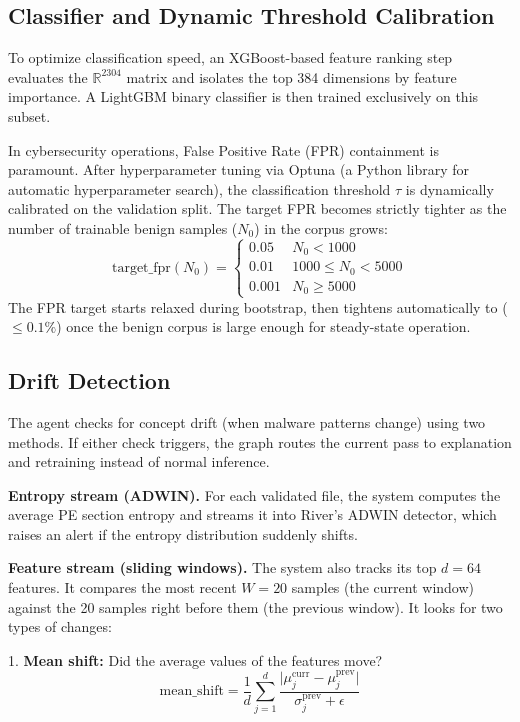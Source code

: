 \documentclass[letterpaper,10pt,conference]{ieeeconf}
\begin{document}
\subsection{Classifier and Dynamic Threshold Calibration}
To optimize classification speed, an XGBoost-based feature ranking step evaluates the $\mathbb{R}^{2304}$ matrix and isolates the top 384 dimensions by feature importance. A LightGBM binary classifier is then trained exclusively on this subset. 

In cybersecurity operations, False Positive Rate (FPR) containment is paramount. After hyperparameter tuning via Optuna (a Python library for automatic hyperparameter search), the classification threshold $\tau$ is dynamically calibrated on the validation split. The target FPR becomes strictly tighter as the number of trainable benign samples ($N_0$) in the corpus grows:
\begin{equation}
\text{target\_fpr}(N_0) =
\begin{cases}
0.05 & N_0 < 1000 \\
0.01 & 1000 \le N_0 < 5000 \\
0.001 & N_0 \ge 5000
\end{cases}
\end{equation}
The FPR target starts relaxed during bootstrap, then tightens automatically to ($\leq 0.1\%$) once the benign corpus is large enough for steady-state operation.

\subsection{Drift Detection}

The agent checks for concept drift (when malware patterns change) using two methods. If either check triggers, the graph routes the current pass to explanation and retraining instead of normal inference.

\textbf{Entropy stream (ADWIN).} 
For each validated file, the system computes the average PE section entropy and streams it into River's ADWIN detector, which raises an alert if the entropy distribution suddenly shifts.

\textbf{Feature stream (sliding windows).} 
The system also tracks its top $d=64$ features. It compares the most recent $W=20$ samples (the current window) against the 20 samples right before them (the previous window). It looks for two types of changes:

1. \textbf{Mean shift:} Did the average values of the features move? 
\begin{equation}
    \mathrm{mean\_shift} = \frac{1}{d}\sum_{j=1}^{d}\frac{\bigl|\mu^{\mathrm{curr}}_j-\mu^{\mathrm{prev}}_j\bigr|}{\sigma^{\mathrm{prev}}_j+\epsilon}
\end{equation}
\end{document}
